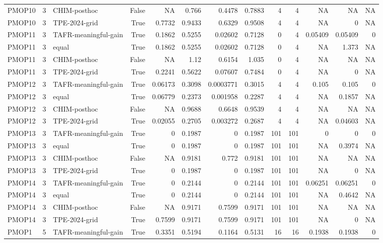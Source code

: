 \begin{tabular}{lrlrrrrrrrrrr}
PMOP10 & 3 & CHIM-posthoc & False & NA & 0.766 & 0.4478 & 0.7883 & 4 & 4 & NA & NA & NA \\
PMOP10 & 3 & TPE-2024-grid & True & 0.7732 & 0.9433 & 0.6329 & 0.9508 & 4 & 4 & NA & 0 & NA \\
PMOP11 & 3 & TAFR-meaningful-gain & True & 0.1862 & 0.5255 & 0.02602 & 0.7128 & 0 & 4 & 0.05409 & 0.05409 & 0 \\
PMOP11 & 3 & equal & True & 0.1862 & 0.5255 & 0.02602 & 0.7128 & 0 & 4 & NA & 1.373 & NA \\
PMOP11 & 3 & CHIM-posthoc & False & NA & 1.12 & 0.6154 & 1.035 & 0 & 4 & NA & NA & NA \\
PMOP11 & 3 & TPE-2024-grid & True & 0.2241 & 0.5622 & 0.07607 & 0.7484 & 0 & 4 & NA & 0 & NA \\
PMOP12 & 3 & TAFR-meaningful-gain & True & 0.06173 & 0.3098 & 0.0003771 & 0.3015 & 4 & 4 & 0.105 & 0.105 & 0 \\
PMOP12 & 3 & equal & True & 0.06779 & 0.2373 & 0.001958 & 0.2287 & 4 & 4 & NA & 0.1857 & NA \\
PMOP12 & 3 & CHIM-posthoc & False & NA & 0.9688 & 0.6648 & 0.9539 & 4 & 4 & NA & NA & NA \\
PMOP12 & 3 & TPE-2024-grid & True & 0.02055 & 0.2705 & 0.003272 & 0.2687 & 4 & 4 & NA & 0.04603 & NA \\
PMOP13 & 3 & TAFR-meaningful-gain & True & 0 & 0.1987 & 0 & 0.1987 & 101 & 101 & 0 & 0 & 0 \\
PMOP13 & 3 & equal & True & 0 & 0.1987 & 0 & 0.1987 & 101 & 101 & NA & 0.3974 & NA \\
PMOP13 & 3 & CHIM-posthoc & False & NA & 0.9181 & 0.772 & 0.9181 & 101 & 101 & NA & NA & NA \\
PMOP13 & 3 & TPE-2024-grid & True & 0 & 0.1987 & 0 & 0.1987 & 101 & 101 & NA & 0 & NA \\
PMOP14 & 3 & TAFR-meaningful-gain & True & 0 & 0.2144 & 0 & 0.2144 & 101 & 101 & 0.06251 & 0.06251 & 0 \\
PMOP14 & 3 & equal & True & 0 & 0.2144 & 0 & 0.2144 & 101 & 101 & NA & 0.4642 & NA \\
PMOP14 & 3 & CHIM-posthoc & False & NA & 0.9171 & 0.7599 & 0.9171 & 101 & 101 & NA & NA & NA \\
PMOP14 & 3 & TPE-2024-grid & True & 0.7599 & 0.9171 & 0.7599 & 0.9171 & 101 & 101 & NA & 0 & NA \\
PMOP1 & 5 & TAFR-meaningful-gain & True & 0.3351 & 0.5194 & 0.1164 & 0.5131 & 16 & 16 & 0.1938 & 0.1938 & 0 \\

\end{tabular}

